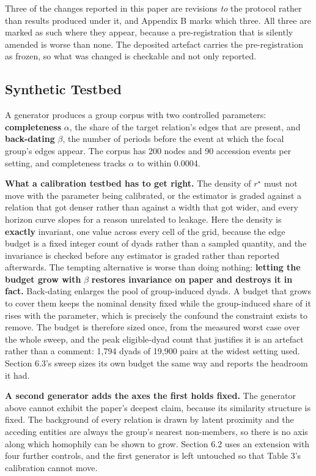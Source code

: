 \documentclass[twoside,11pt]{article}
\begin{document}
Three of the changes reported in this paper are revisions \emph{to} the protocol rather than results produced under it, and Appendix B marks which three. All three are marked as such where they appear, because a pre-registration that is silently amended is worse than none. The deposited artefact carries the pre-registration as frozen, so what was changed is checkable and not only reported.

\subsection{Synthetic Testbed}

A generator produces a group corpus with two controlled parameters: \textbf{completeness} \(\alpha\), the share of the target relation's edges that are present, and \textbf{back-dating} \(\beta\), the number of periods before the event at which the focal group's edges appear. The corpus has 200 nodes and 90 accession events per setting, and completeness tracks \(\alpha\) to within 0.0004.

\textbf{What a calibration testbed has to get right.} The density of \(r^{\star}\) must not move with the parameter being calibrated, or the estimator is graded against a relation that got denser rather than against a width that got wider, and every horizon curve slopes for a reason unrelated to leakage. Here the density is \textbf{exactly} invariant, one value across every cell of the grid, because the edge budget is a fixed integer count of dyads rather than a sampled quantity, and the invariance is checked before any estimator is graded rather than reported afterwards. The tempting alternative is worse than doing nothing: \textbf{letting the budget grow with} \(\beta\) \textbf{restores invariance on paper and destroys it in fact.} Back-dating enlarges the pool of group-induced dyads. A budget that grows to cover them keeps the nominal density fixed while the group-induced share of it rises with the parameter, which is precisely the confound the constraint exists to remove. The budget is therefore sized once, from the measured worst case over the whole sweep, and the peak eligible-dyad count that justifies it is an artefact rather than a comment: 1,794 dyads of 19,900 pairs at the widest setting used. Section 6.3's sweep sizes its own budget the same way and reports the headroom it had.

\textbf{A second generator adds the axes the first holds fixed.} The generator above cannot exhibit the paper's deepest claim, because its similarity structure is fixed. The background of every relation is drawn by latent proximity and the acceding entities are always the group's nearest non-members, so there is no axis along which homophily can be shown to grow. Section 6.2 uses an extension with four further controls, and the first generator is left untouched so that Table 3's calibration cannot move.
\end{document}
